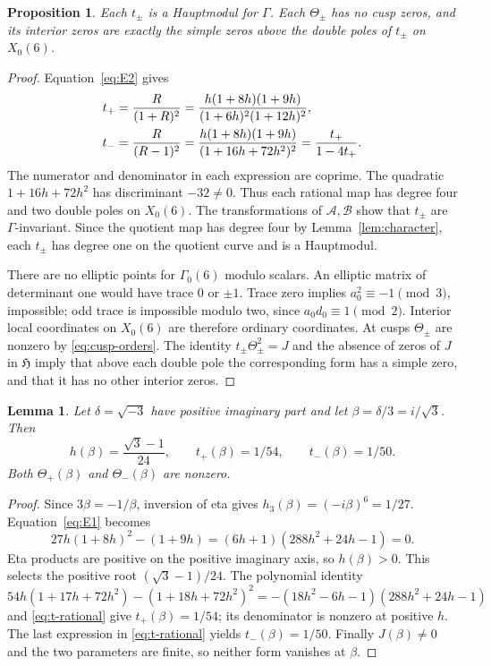 \documentclass[11pt,a4paper]{article}
\newtheorem{proposition}[theorem]{Proposition}
\newtheorem{lemma}[theorem]{Lemma}
\theoremstyle{remark}\newtheorem{remark}[theorem]{Remark}
\newcommand{\HH}{\mathfrak H}
\newcommand{\A}{\mathcal A}\newcommand{\B}{\mathcal B}
\begin{document}
\begin{proposition}\label{prop:geometry}
Each $t_\pm$ is a Hauptmodul for $\Gamma$.
Each $\Theta_\pm$ has no cusp zeros, and its interior zeros are exactly
the simple zeros above the double poles of $t_\pm$ on $X_0(6)$.
\end{proposition}
\begin{proof}
Equation~\eqref{eq:E2} gives
\begin{align}\label{eq:t-rational}
 t_+&=\frac{R}{(1+R)^2}
 =\frac{h(1+8h)(1+9h)}{(1+6h)^2(1+12h)^2},\notag\\
 t_-&=\frac{R}{(R-1)^2}
 =\frac{h(1+8h)(1+9h)}{(1+16h+72h^2)^2}
 =\frac{t_+}{1-4t_+}.
\end{align}
The numerator and denominator in each expression are coprime.
The quadratic $1+16h+72h^2$ has discriminant $-32\ne0$.
Thus each rational map has degree four and two double poles on $X_0(6)$.
The transformations of $\A,\B$ show that $t_\pm$ are $\Gamma$-invariant.
Since the quotient map has degree four by Lemma~\ref{lem:character},
each $t_\pm$ has degree one on the quotient curve and is a Hauptmodul.

There are no elliptic points for $\Gamma_0(6)$ modulo scalars.
An elliptic matrix of determinant one would have trace $0$ or $\pm1$.
Trace zero implies $a_0^2\equiv-1\pmod3$, impossible; odd trace is
impossible modulo two, since $a_0d_0\equiv1\pmod2$.
Interior local coordinates on $X_0(6)$ are therefore ordinary coordinates.
At cusps $\Theta_\pm$ are nonzero by \eqref{eq:cusp-orders}.
The identity $t_\pm\Theta_\pm^2=J$ and the absence of zeros of $J$ in
$\HH$ imply that above each double pole the corresponding form has a
simple zero, and that it has no other interior zeros.
\end{proof}

\begin{lemma}\label{lem:CM-point}
Let $\delta=\sqrt{-3}$ have positive imaginary part and let
$\beta=\delta/3=i/\sqrt3$. Then
\begin{equation}\label{eq:CM-point}
 h(\beta)=\frac{\sqrt3-1}{24},\qquad
 t_+(\beta)=1/54,\qquad t_-(\beta)=1/50.
\end{equation}
Both $\Theta_+(\beta)$ and $\Theta_-(\beta)$ are nonzero.
\end{lemma}
\begin{proof}
Since $3\beta=-1/\beta$, inversion of eta gives
$h_3(\beta)=(-i\beta)^6=1/27$.
Equation~\eqref{eq:E1} becomes
\[
 27h(1+8h)^2-(1+9h)=(6h+1)(288h^2+24h-1)=0.
\]
Eta products are positive on the positive imaginary axis, so $h(\beta)>0$.
This selects the positive root $(\sqrt3-1)/24$.
The polynomial identity
\[
 54h(1+17h+72h^2)-(1+18h+72h^2)^2
 =-(18h^2-6h-1)(288h^2+24h-1)
\]
and \eqref{eq:t-rational} give $t_+(\beta)=1/54$;
its denominator is nonzero at positive $h$. The last expression in
\eqref{eq:t-rational} yields $t_-(\beta)=1/50$.
Finally $J(\beta)\ne0$ and the two parameters are finite, so neither
form vanishes at $\beta$.
\end{proof}
\end{document}
